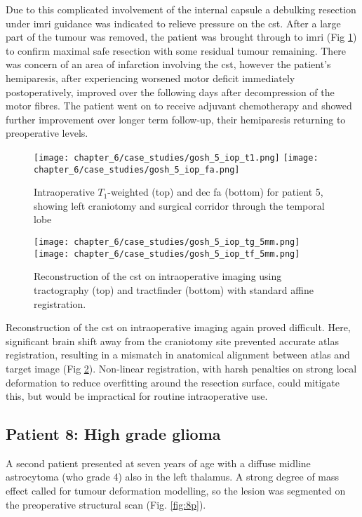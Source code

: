 Due to this complicated involvement of the internal capsule a debulking resection under \gls{imri} guidance was indicated to relieve pressure on the \gls{cst}.
After a large part of the tumour was removed, the patient was brought through to \gls{imri} (Fig \ref{fig:5i}) to confirm maximal safe resection with some residual tumour remaining.
There was concern of an area of infarction involving the \gls{cst}, however the patient's hemiparesis, after experiencing worsened motor deficit immediately postoperatively, improved over the following days after decompression of the motor fibres.
The patient went on to receive adjuvant chemotherapy and showed further improvement over longer term follow-up, their hemiparesis returning to preoperative levels.

\begin{figure}[htb!]
  \centering
  \texttt{[image: chapter\_6/case\_studies/gosh\_5\_iop\_t1.png]}
  \texttt{[image: chapter\_6/case\_studies/gosh\_5\_iop\_fa.png]}
  \caption{Intraoperative $T_1$-weighted (top) and \gls{dec} \gls{fa} (bottom) for patient 5, showing left craniotomy and surgical corridor through the temporal lobe}
  \label{fig:5i}
\end{figure}

\begin{figure}[htb!]
  \centering
  \texttt{[image: chapter\_6/case\_studies/gosh\_5\_iop\_tg\_5mm.png]}
  \texttt{[image: chapter\_6/case\_studies/gosh\_5\_iop\_tf\_5mm.png]}
  \caption{Reconstruction of the \gls{cst} on intraoperative imaging using tractography (top) and tractfinder (bottom) with standard affine registration.}
  \label{fig:5i_cst}
\end{figure}

Reconstruction of the \gls{cst} on intraoperative imaging again proved difficult.
Here, significant brain shift away from the craniotomy site prevented accurate atlas registration, resulting in a mismatch in anatomical alignment between atlas and target image (Fig \ref{fig:5i_cst}).
Non-linear registration, with harsh penalties on strong local deformation to reduce overfitting around the resection surface, could mitigate this, but would be impractical for routine intraoperative use.

\subsection{Patient 8: High grade glioma}

A second patient presented at seven years of age with a diffuse midline astrocytoma (\gls{who} grade 4) also in the left thalamus.
A strong degree of mass effect called for tumour deformation modelling, so the lesion was segmented on the preoperative structural scan (Fig. \ref{fig:8p}).

